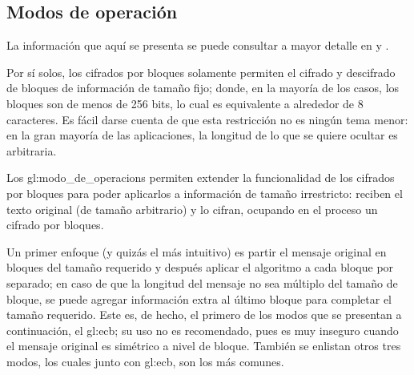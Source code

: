 %
%

\subsection{Modos de operación}
\label{sec:modos}

La información que aquí se presenta se puede consultar a mayor detalle en
\cite{modos_de_operacion} y \cite{menezes}.

Por sí solos, los cifrados por bloques solamente permiten el cifrado y
descifrado de bloques de información de tamaño fijo; donde, en la mayoría de
los casos, los bloques son de menos de 256 bits, lo cual es equivalente a
alrededor de 8 caracteres. Es fácil darse cuenta de que esta restricción no es
ningún tema menor: en la gran mayoría de las aplicaciones, la longitud de lo
que se quiere ocultar es arbitraria.

Los \glspl{gl:modo_de_operacion} permiten extender la funcionalidad de los
cifrados por bloques para poder aplicarlos a información de tamaño irrestricto:
reciben el texto original (de tamaño arbitrario) y lo cifran, ocupando en el
proceso un cifrado por bloques.

Un primer enfoque (y quizás el más intuitivo) es partir el mensaje original
en bloques del tamaño requerido y después aplicar el algoritmo a cada bloque
por separado; en caso de que la longitud del mensaje no sea múltiplo del
tamaño de bloque, se puede agregar información extra al último bloque para
completar el tamaño requerido. Este es, de hecho, el primero de los modos que
se presentan a continuación, el \gls{gl:ecb}; su uso no es
recomendado, pues es muy inseguro cuando el mensaje original es simétrico a
nivel de bloque. También se enlistan otros tres modos, los cuales junto con
\gls{gl:ecb}, son los más comunes.







